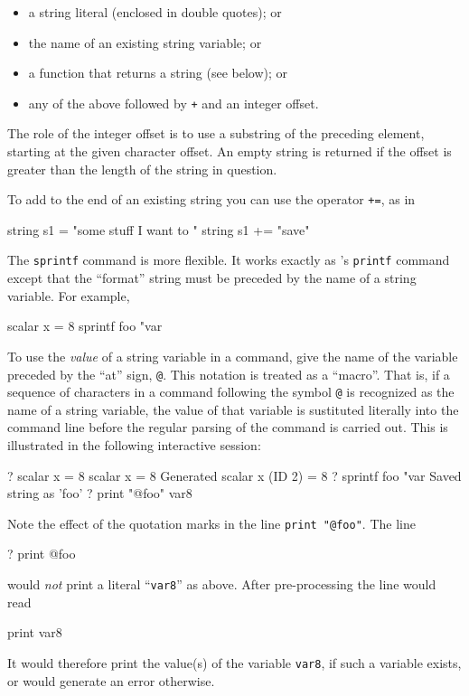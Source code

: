 \begin{itemize}
\item a string literal (enclosed in double quotes); or
\item the name of an existing string variable; or
\item a function that returns a string (see below); or
\item any of the above followed by \texttt{+} and an integer offset.
\end{itemize}

The role of the integer offset is to use a substring of the preceding
element, starting at the given character offset.  An empty string is
returned if the offset is greater than the length of the string in
question.

To add to the end of an existing string you can use the operator
\texttt{+=}, as in
%
\begin{code}
string s1 = "some stuff I want to "
string s1 += "save"
\end{code}

The \texttt{sprintf} command is more flexible.  It works exactly as
's \texttt{printf} command except that the ``format''
string must be preceded by the name of a string variable.  For
example,
%
\begin{code}
scalar x = 8
sprintf foo "var%
\end{code}

To use the \emph{value} of a string variable in a command, give the
name of the variable preceded by the ``at'' sign, \verb|@|.  This
notation is treated as a ``macro''.  That is, if a sequence of
characters in a  command following the symbol \verb|@| is
recognized as the name of a string variable, the value of that
variable is sustituted literally into the command line before the
regular parsing of the command is carried out.  This is illustrated in
the following interactive session:
%
\begin{code}
? scalar x = 8
 scalar x = 8
Generated scalar x (ID 2) = 8
? sprintf foo "var%
Saved string as 'foo'
? print "@foo"
var8
\end{code}
%
Note the effect of the quotation marks in the line 
\verb|print "@foo"|.  The line
%
\begin{code}
? print @foo
\end{code}
%
would \textit{not} print a literal ``\texttt{var8}'' as above.  After
pre-processing the line would read
%
\begin{code}
print var8
\end{code}
%
It would therefore print the value(s) of the variable \texttt{var8},
if such a variable exists, or would generate an error otherwise.

